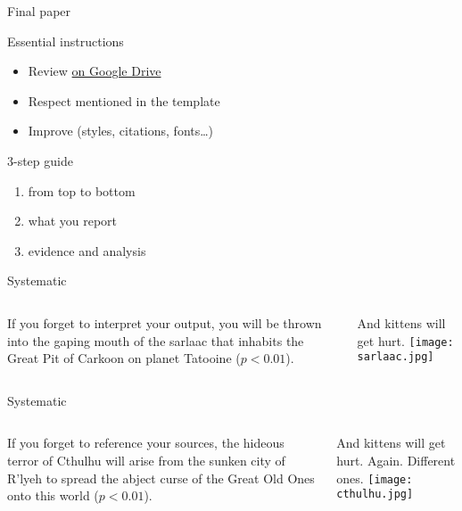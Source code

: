 \documentclass[t]{beamer}
\begin{document}
	\begin{frame}[t]{Final paper}

		\begin{block}{Essential instructions}

			\begin{itemize}
				\item Review  \href{https://docs.google.com/document/d/1s-lZWDen7RWPcsIdJoxIDa8Q7V-AGisz61Hg1bQpq8c/edit}{on Google Drive}
				\item Respect  mentioned in the template
				\item Improve  (styles, citations, fonts…)
			\end{itemize}
			
		\end{block}

		\begin{block}{3-step guide}

			\begin{enumerate}
				\item {} from top to bottom
				\item {} what you report
				\item {} evidence and analysis
			\end{enumerate}

		\end{block}
					
	\end{frame}

	\begin{frame}[t]{Systematic }
		\begin{columns}[T]
			If you forget to interpret your output, you will be thrown into the gaping mouth of the sarlaac that inhabits the Great Pit of Carkoon on planet Tatooine ($p < 0.01$).\vspace{1em}
			
			And kittens will get hurt.
			\texttt{[image: sarlaac.jpg]}
		\end{columns}
	\end{frame}

	\begin{frame}[t]{Systematic }
		\begin{columns}[T]
			If you forget to reference your sources, the hideous terror of Cthulhu will arise from the sunken city of R'lyeh to spread the abject curse of the Great Old Ones onto this world ($p < 0.01$).\vspace{1em}
		
			And kittens will get hurt. Again. Different ones.
			\texttt{[image: cthulhu.jpg]}
		\end{columns}
	\end{frame}
	
\end{document}
